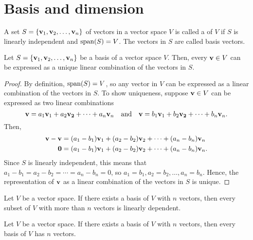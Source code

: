 \section{Basis and dimension}

\begin{defn}
A set $ S=\{\mathbf{v}_1,\mathbf{v}_2,\ldots,\mathbf{v}_n\} $ of vectors in a vector space $ V $ is called a  of $ V $ if $ S $ is linearly independent and $ \operatorname{span}(S)=V $. The vectors in $ S $ are called basis vectors.
\end{defn}

\begin{thm}
Let $ S=\{\mathbf{v}_1,\mathbf{v}_2,\ldots,\mathbf{v}_n\} $ be a basis of a vector space $ V $. Then, every $ \mathbf{v}\in V $ can be expressed as a unique linear combination of the vectors in $ S $.
\end{thm}
\begin{proof}
By definition, $ \operatorname{span}(S)=V $, so any vector in $ V $ can be expressed as a linear combination of the vectors in $ S $. To show uniqueness, suppose $ \mathbf{v}\in V $ can be expressed as two linear combinations
\begin{equation*}
    \mathbf{v}=a_1\mathbf{v}_1+a_2\mathbf{v_2}+\cdots+a_n\mathbf{v}_n \quad\text{and}\quad \mathbf{v}=b_1\mathbf{v}_1+b_2\mathbf{v_2}+\cdots+b_n\mathbf{v}_n.
\end{equation*}
Then,
\begin{align*}
    \mathbf{v}-\mathbf{v} &= (a_1-b_1)\mathbf{v}_1+(a_2-b_2)\mathbf{v}_2+\cdots+(a_n-b_n)\mathbf{v}_n \\
    \mathbf{0} &= (a_1-b_1)\mathbf{v}_1+(a_2-b_2)\mathbf{v}_2+\cdots+(a_n-b_n)\mathbf{v}_n.
\end{align*}
Since $ S $ is linearly independent, this means that $ a_1-b_1=a_2-b_2=\cdots=a_n-b_n=0 $, so $ a_1=b_1,a_2=b_2,\ldots,a_n=b_n $. Hence, the representation of $ \mathbf{v} $ as a linear combination of the vectors in $ S $ is unique.
\end{proof}

\begin{thm}
Let $ V $ be a vector space. If there exists a basis of $ V $ with $ n $ vectors, then every subset of $ V $ with more than $ n $ vectors is linearly dependent.
\end{thm}

\begin{cor}
Let $ V $ be a vector space. If there exists a basis of $ V $ with $ n $ vectors, then every basis of $ V $ has $ n $ vectors.
\end{cor}

